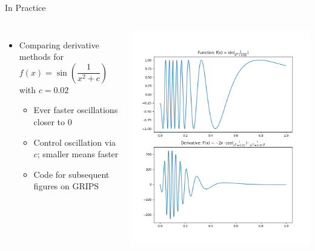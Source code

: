\begin{frame}[fragile]{In Practice}
%
\begin{columns}
\begin{itemize}
\item Comparing derivative methods for $f(x) = \sin(\dfrac{1}{x^2 + c})$ with $c = 0.02$
	\begin{itemize}
	\item Ever faster oscillations closer to 0
	\item Control oscillation via $c$; smaller means faster
	\item Code for subsequent figures on GRIPS
	\end{itemize}
\end{itemize}
%
\includegraphics[width=\linewidth]{./gfx/03-derivative-functions}
\end{columns}
%
\end{frame}



